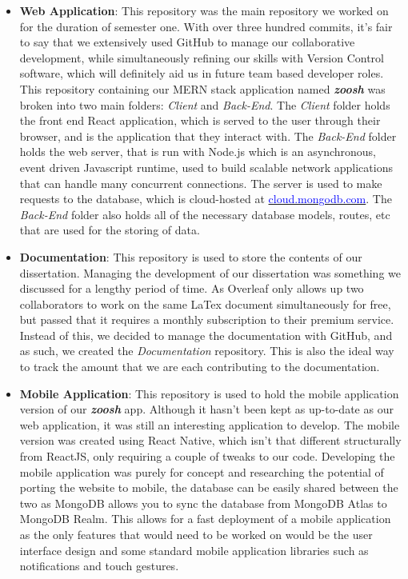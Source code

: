 \begin{itemize}
    \item \textbf{Web Application}: This repository was the main repository we worked on for the duration of semester one. With over three hundred commits, it's fair to say that we extensively used GitHub to manage our collaborative development, while simultaneously refining our skills with Version Control software, which will definitely aid us in future team based developer roles. This repository containing our MERN stack application named \textit{\textbf{zoosh}} was broken into two main folders: \textit{Client} and \textit{Back-End}. The \textit{Client} folder holds the front end React application, which is served to the user through their browser, and is the application that they interact with. The \textit{Back-End} folder holds the web server, that is run with Node.js which is an asynchronous, event driven Javascript runtime, used to build scalable network applications that can handle many concurrent connections. The server is used to make requests to the database, which is cloud-hosted at \href{https://cloud.mongodb.com/v2/5e930ffe4cdf590dd97ad867#clusters}{\textcolor{blue}{cloud.mongodb.com}}. The \textit{Back-End} folder also holds all of the necessary database models, routes, etc that are used for the storing of data.
    \item \textbf{Documentation}: This repository is used to store the contents of our dissertation. Managing the development of our dissertation was something we discussed for a lengthy period of time. As Overleaf only allows up two collaborators to work on the same LaTex document simultaneously for free, but passed that it requires a monthly subscription to their premium service. Instead of this, we decided to manage the documentation with GitHub, and as such, we created the \textit{Documentation} repository. This is also the ideal way to track the amount that we are each contributing to the documentation.
    \item \textbf{Mobile Application}: This repository is used to hold the mobile application version of our \textit{\textbf{zoosh}} app. Although it hasn't been kept as up-to-date as our web application, it was still an interesting application to develop. The mobile version was created using React Native, which isn't that different structurally from ReactJS, only requiring a couple of tweaks to our code. Developing the mobile application was purely for concept and researching the potential of porting the website to mobile, the database can be easily shared between the two as MongoDB allows you to sync the database from MongoDB Atlas to MongoDB Realm. This allows for a fast deployment of a mobile application as the only features that would need to be worked on would be the user interface design and some standard mobile application libraries such as notifications and touch gestures.
\end{itemize}


